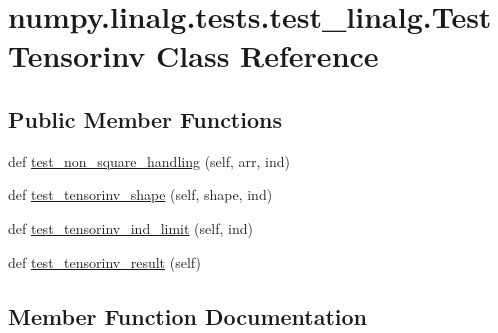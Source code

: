 \hypertarget{classnumpy_1_1linalg_1_1tests_1_1test__linalg_1_1TestTensorinv}{}\section{numpy.\+linalg.\+tests.\+test\+\_\+linalg.\+Test\+Tensorinv Class Reference}
\label{classnumpy_1_1linalg_1_1tests_1_1test__linalg_1_1TestTensorinv}
\subsection*{Public Member Functions}
\begin{DoxyCompactItemize}
\item 
def \hyperlink{classnumpy_1_1linalg_1_1tests_1_1test__linalg_1_1TestTensorinv_a195d4682f05e719d5053f286a1b1d1fb}{test\+\_\+non\+\_\+square\+\_\+handling} (self, arr, ind)
\item 
def \hyperlink{classnumpy_1_1linalg_1_1tests_1_1test__linalg_1_1TestTensorinv_a88720560bc3756a6921b80b0d8b42b75}{test\+\_\+tensorinv\+\_\+shape} (self, shape, ind)
\item 
def \hyperlink{classnumpy_1_1linalg_1_1tests_1_1test__linalg_1_1TestTensorinv_a243be8049d19ab6c2adcea628e6f516c}{test\+\_\+tensorinv\+\_\+ind\+\_\+limit} (self, ind)
\item 
def \hyperlink{classnumpy_1_1linalg_1_1tests_1_1test__linalg_1_1TestTensorinv_aeb8feab7ad9cd022b1059b7d6be2e843}{test\+\_\+tensorinv\+\_\+result} (self)
\end{DoxyCompactItemize}


\subsection{Member Function Documentation}
\mbox{\label{classnumpy_1_1linalg_1_1tests_1_1test__linalg_1_1TestTensorinv_a195d4682f05e719d5053f286a1b1d1fb}} 
